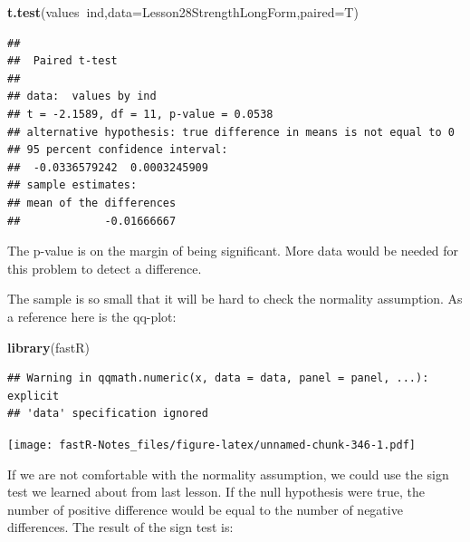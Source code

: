 \documentclass[]{book}
\newenvironment{Shaded}{\begin{snugshade}}{\end{snugshade}}
\newcommand{\KeywordTok}[1]{\textcolor[rgb]{0.13,0.29,0.53}{\textbf{#1}}}
\newcommand{\DataTypeTok}[1]{\textcolor[rgb]{0.13,0.29,0.53}{#1}}
\newcommand{\DecValTok}[1]{\textcolor[rgb]{0.00,0.00,0.81}{#1}}
\newcommand{\OperatorTok}[1]{\textcolor[rgb]{0.81,0.36,0.00}{\textbf{#1}}}
\newcommand{\NormalTok}[1]{#1}
\theoremstyle{definition}
\theoremstyle{definition}
\theoremstyle{definition}
\theoremstyle{remark}
\begin{document}
\begin{Shaded}
\begin{Highlighting}[]
\KeywordTok{t.test}\NormalTok{(values}\OperatorTok{~}\NormalTok{ind,}\DataTypeTok{data=}\NormalTok{Lesson28StrengthLongForm,}\DataTypeTok{paired=}\NormalTok{T)}
\end{Highlighting}
\end{Shaded}

\begin{verbatim}
## 
##  Paired t-test
## 
## data:  values by ind
## t = -2.1589, df = 11, p-value = 0.0538
## alternative hypothesis: true difference in means is not equal to 0
## 95 percent confidence interval:
##  -0.0336579242  0.0003245909
## sample estimates:
## mean of the differences 
##             -0.01666667
\end{verbatim}

The p-value is on the margin of being significant. More data would be
needed for this problem to detect a difference.

The sample is so small that it will be hard to check the normality
assumption. As a reference here is the qq-plot:

\begin{Shaded}
\begin{Highlighting}[]
\KeywordTok{library}\NormalTok{(fastR)}
\end{Highlighting}
\end{Shaded}

\begin{Shaded}
\end{Shaded}

\begin{verbatim}
## Warning in qqmath.numeric(x, data = data, panel = panel, ...): explicit
## 'data' specification ignored
\end{verbatim}

\texttt{[image: fastR-Notes\_files/figure-latex/unnamed-chunk-346-1.pdf]}

If we are not comfortable with the normality assumption, we could use
the sign test we learned about from last lesson. If the null hypothesis
were true, the number of positive difference would be equal to the
number of negative differences. The result of the sign test is:

\begin{Shaded}
\end{Shaded}
\end{document}
